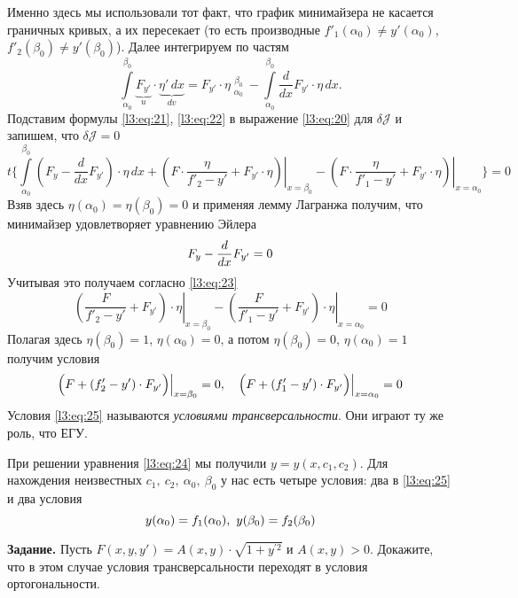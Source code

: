 \documentclass[12pt,a4paper,openany,fleqn]{book}
\newcommand{\J}{\ensuremath{\mathcal{J}}}
\newcommand{\der}[2]{\ensuremath{\frac{d#1}{d#2}}}
\theoremstyle{definition}
\begin{document}
Именно здесь мы использовали тот факт, что график минимайзера не касается граничных кривых, а их пересекает (то есть производные $f'_1(\alpha_0)\neq y'(\alpha_0)$,\ $f'_2(\beta_0)\neq y'(\beta_0)$). Далее интегрируем по частям 
\begin{equation}
	\label{l3:eq:22}
	\int\limits_{\alpha_0}^{\beta_0}\underbrace{F_{y'}}_{u}\cdot\underbrace{\eta'\,dx}_{dv}=F_{y'}\cdot\eta\mathop{\Big|}\limits_{\alpha_0}^{\beta_0}-\int\limits_{\alpha_0}^{\beta_0}\der{}{x}F_{y'}\cdot\eta\,dx.
\end{equation}
Подставим формулы \eqref{l3:eq:21}, \eqref{l3:eq:22} в выражение \eqref{l3:eq:20} для $\delta\J$ и запишем, что $\delta\J=0$
\begin{equation}
	\label{l3:eq:23}
	t\Bigg\{\int\limits_{\alpha_0}^{\beta_0}\left(F_{y}-\der{}{x}F_{y'}\right)\cdot\eta\,dx+\left.\left(F\cdot\frac{\eta}{f'_2-y'}+F_{y'}\cdot\eta\right)\right|_{x=\beta_0}-\left.\left(F\cdot\frac{\eta}{f'_1-y'}+F_{y'}\cdot\eta\right)\right|_{x=\alpha_0}\Bigg\}=0
\end{equation}
Взяв здесь $\eta(\alpha_0)=\eta(\beta_0)=0$ и применяя лемму Лагранжа получим, что минимайзер удовлетворяет уравнению Эйлера 
\begin{equation}
	\label{l3:eq:24}
	\hfill F_{y}-\der{}{x}F_{y'}=0\hfill
\end{equation}
Учитывая это получаем согласно \eqref{l3:eq:23} 
\begin{equation*}
	\left.\left(\frac{F}{f'_2-y'}+F_{y'}\right)\cdot\eta\right|_{x=\beta_0}-\left.\left(\frac{F}{f'_1-y'}+F_{y'}\right)\cdot\eta\right|_{x=\alpha_0}=0
\end{equation*}
Полагая здесь $\eta(\beta_0)=1$, $\eta(\alpha_0)=0$, а потом $\eta(\beta_0)=0$, $\eta(\alpha_0)=1$ получим условия
\begin{equation}
	\label{l3:eq:25}
	\hfill \Big(F+(f'_2-y')\cdot F_{y'}\Big)\Big|_{x=\beta_0}=0,\quad \Big(F+(f'_1-y')\cdot F_{y'}\Big)\Big|_{x=\alpha_0}=0\hfill
\end{equation}
Условия \eqref{l3:eq:25} называются \emph{условиями трансверсальности}. Они играют ту же роль, что ЕГУ.

При решении уравнения \eqref{l3:eq:24} мы получили $y=y(x,c_1,c_2)$. Для нахождения неизвестных $c_1,\ c_2,\ \alpha_0,\ \beta_0$ у нас есть четыре условия: два в \eqref{l3:eq:25} и два условия
\begin{equation*}
	\hfill y(\alpha_0)=f_1(\alpha_0),\ y(\beta_0)=f_2(\beta_0)\hfill
\end{equation*}
\vspace{0.2cm}

\noindent\textbf{Задание. }Пусть $F(x,y,y')=A(x,y)\cdot\sqrt{1+y^{\prime2}}$ и $A(x,y)>0$. Докажите, что в этом случае условия трансверсальности переходят в условия ортогональности. 
\end{document}
